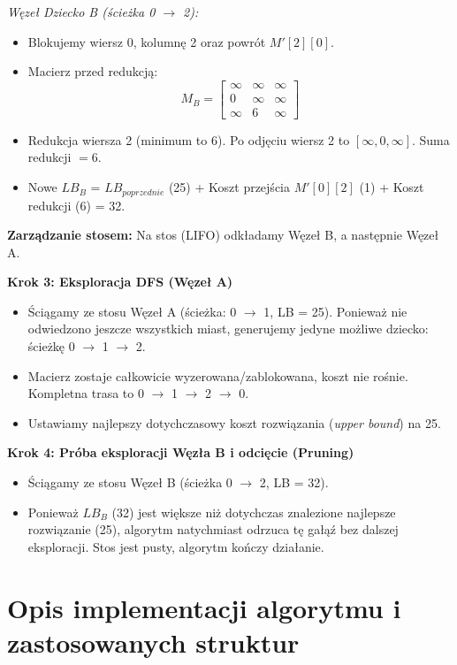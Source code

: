 \documentclass[12pt, a4paper]{article}
\begin{document}
	\textit{Węzeł Dziecko B (ścieżka 0 $\rightarrow$ 2):}
	\begin{itemize}
		\item Blokujemy wiersz 0, kolumnę 2 oraz powrót $M'[2][0]$.
		\item Macierz przed redukcją:
		$$ M_B = \begin{bmatrix} \infty & \infty & \infty \\ 0 & \infty & \infty \\ \infty & 6 & \infty \end{bmatrix} $$
		\item Redukcja wiersza 2 (minimum to 6). Po odjęciu wiersz 2 to $[\infty, 0, \infty]$. Suma redukcji $= 6$.
		\item Nowe $LB_B$ = $LB_{poprzednie}$ (25) + Koszt przejścia $M'[0][2]$ (1) + Koszt redukcji (6) = 32.
	\end{itemize}
	\textbf{Zarządzanie stosem:} Na stos (LIFO) odkładamy Węzeł B, a następnie Węzeł A.
	
	\textbf{Krok 3: Eksploracja DFS (Węzeł A)}
	\begin{itemize}
		\item Ściągamy ze stosu Węzeł A (ścieżka: 0 $\rightarrow$ 1, LB = 25). Ponieważ nie odwiedzono jeszcze wszystkich miast, generujemy jedyne możliwe dziecko: ścieżkę 0 $\rightarrow$ 1 $\rightarrow$ 2.
		\item Macierz zostaje całkowicie wyzerowana/zablokowana, koszt nie rośnie. Kompletna trasa to 0 $\rightarrow$ 1 $\rightarrow$ 2 $\rightarrow$ 0.
		\item Ustawiamy najlepszy dotychczasowy koszt rozwiązania (\textit{upper bound}) na 25.
	\end{itemize}
	
	\textbf{Krok 4: Próba eksploracji Węzła B i odcięcie (Pruning)}
	\begin{itemize}
		\item Ściągamy ze stosu Węzeł B (ścieżka 0 $\rightarrow$ 2, LB = 32).
		\item Ponieważ $LB_B$ (32) jest większe niż dotychczas znalezione najlepsze rozwiązanie (25), algorytm natychmiast odrzuca tę gałąź bez dalszej eksploracji. Stos jest pusty, algorytm kończy działanie.
	\end{itemize}
	
	
	\section{Opis implementacji algorytmu i zastosowanych struktur}
	
\end{document}

